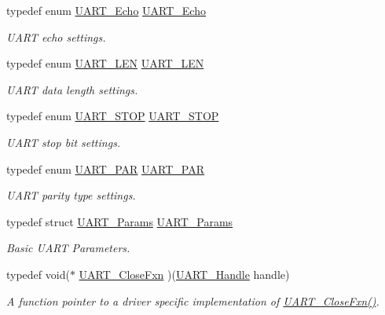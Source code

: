 \begin{DoxyCompactItemize}
typedef enum \hyperlink{_u_a_r_t_8h_aac6a03c2e1d76f53e1d9d923dcdc24f2}{U\-A\-R\-T\-\_\-\-Echo} \hyperlink{_u_a_r_t_8h_a5372f2a3d7f68aa38ea560ed5fe520a9}{U\-A\-R\-T\-\_\-\-Echo}
\begin{DoxyCompactList}\small\item\em U\-A\-R\-T echo settings. \end{DoxyCompactList}\item 
typedef enum \hyperlink{_u_a_r_t_8h_adf245d5f10db0abcbd8ad62a0d80c694}{U\-A\-R\-T\-\_\-\-L\-E\-N} \hyperlink{_u_a_r_t_8h_a9290f6d71215e218998106ddff83911b}{U\-A\-R\-T\-\_\-\-L\-E\-N}
\begin{DoxyCompactList}\small\item\em U\-A\-R\-T data length settings. \end{DoxyCompactList}\item 
typedef enum \hyperlink{_u_a_r_t_8h_a176b71ca19bc13d7534fa30fc18c2243}{U\-A\-R\-T\-\_\-\-S\-T\-O\-P} \hyperlink{_u_a_r_t_8h_a7f2ba2e85c63055e158e5e4b51b1f9fd}{U\-A\-R\-T\-\_\-\-S\-T\-O\-P}
\begin{DoxyCompactList}\small\item\em U\-A\-R\-T stop bit settings. \end{DoxyCompactList}\item 
typedef enum \hyperlink{_u_a_r_t_8h_ac70b5aa75500b8c45a51ec560deccfc4}{U\-A\-R\-T\-\_\-\-P\-A\-R} \hyperlink{_u_a_r_t_8h_a12584e934e85933c6b20b59b0ac5c343}{U\-A\-R\-T\-\_\-\-P\-A\-R}
\begin{DoxyCompactList}\small\item\em U\-A\-R\-T parity type settings. \end{DoxyCompactList}\item 
typedef struct \hyperlink{struct_u_a_r_t___params}{U\-A\-R\-T\-\_\-\-Params} \hyperlink{_u_a_r_t_8h_a533d172a10c22e1e5b94e9d0a055d882}{U\-A\-R\-T\-\_\-\-Params}
\begin{DoxyCompactList}\small\item\em Basic U\-A\-R\-T Parameters. \end{DoxyCompactList}\item 
typedef void($\ast$ \hyperlink{_u_a_r_t_8h_a220a3f8443b9112ee98253078f92eb27}{U\-A\-R\-T\-\_\-\-Close\-Fxn} )(\hyperlink{_u_a_r_t_8h_a13cc669fae768d8212e6491ce71b28af}{U\-A\-R\-T\-\_\-\-Handle} handle)
\begin{DoxyCompactList}\small\item\em A function pointer to a driver specific implementation of \hyperlink{_u_a_r_t_8h_a220a3f8443b9112ee98253078f92eb27}{U\-A\-R\-T\-\_\-\-Close\-Fxn()}. \end{DoxyCompactList}\item 

\end{DoxyCompactItemize}

